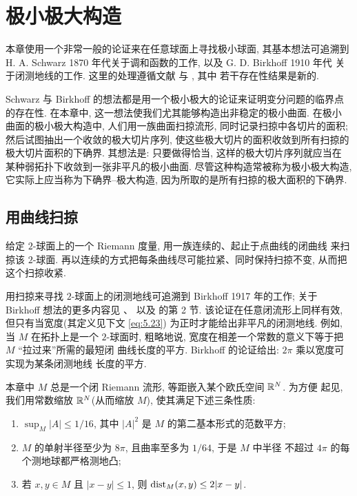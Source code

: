\chapter{极小极大构造}
\label{chap:5}

{\setlength{\emergencystretch}{2em}%
本章使用一个非常一般的论证来在任意球面上寻找极小球面, 其基本想法可追溯到
H. A. Schwarz 1870 年代关于调和函数的工作, 以及 G. D. Birkhoff 1910 年代
关于闭测地线的工作. 这里的处理遵循文献 \cite{CM27} 与 \cite{CM28}, 其中
若干存在性结果是新的.\par}

Schwarz 与 Birkhoff 的想法都是用一个极小极大的论证来证明变分问题的临界点
的存在性. 在本章中, 这一想法使我们尤其能够构造出非稳定的极小曲面. 在极小
曲面的极小极大构造中, 人们用一族曲面扫掠流形, 同时记录扫掠中各切片的面积;
然后试图抽出一个收敛的极大切片序列, 使这些极大切片的面积收敛到所有扫掠的
极大切片面积的下确界. 其想法是: 只要做得恰当, 这样的极大切片序列就应当在
某种弱拓扑下收敛到一张非平凡的极小曲面. 尽管这种构造常被称为极小极大构造,
它实际上应当称为下确界--极大构造, 因为所取的是所有扫掠的极大面积的下确界.

\section{用曲线扫掠}
\label{sec:5.1}

给定 $2$-球面上的一个 Riemann 度量, 用一族连续的、起止于点曲线的闭曲线
来扫掠该 $2$-球面. 再以连续的方式把每条曲线尽可能拉紧、同时保持扫掠不变,
从而把这个扫掠收紧.

用扫掠来寻找 $2$-球面上的闭测地线可追溯到 Birkhoff 1917 年的工作; 关于
Birkhoff 想法的更多内容见 \cite{B1}、\cite{B2} 以及 \cite{Cr} 的第 2 节.
该论证在任意闭流形上同样有效, 但只有当宽度(其定义见下文 \eqref{eq:5.23})
为正时才能给出非平凡的闭测地线. 例如, 当 $M$ 在拓扑上是一个 $2$-球面时,
粗略地说, 宽度在相差一个常数的意义下等于把 $M$ ``拉过来''所需的最短闭
曲线长度的平方. Birkhoff 的论证给出: $2\pi$ 乘以宽度可实现为某条闭测地线
长度的平方.

本章中 $M$ 总是一个闭 Riemann 流形, 等距嵌入某个欧氏空间 $\mathbb{R}^N$. 为方便
起见, 我们用常数缩放 $\mathbb{R}^N$(从而缩放 $M$), 使其满足下述三条性质:

\begin{enumerate}[label=(M\arabic*),leftmargin=3.2em]
\item $\sup_M|A|\leq 1/16$, 其中 $|A|^2$ 是 $M$ 的第二基本形式的范数平方;
\item $M$ 的单射半径至少为 $8\pi$, 且曲率至多为 $1/64$, 于是 $M$ 中半径
      不超过 $4\pi$ 的每个测地球都严格测地凸;
\item 若 $x,y\in M$ 且 $|x-y|\leq 1$, 则 $\operatorname{dist}_M(x,y)\leq 2|x-y|$.
\end{enumerate}

